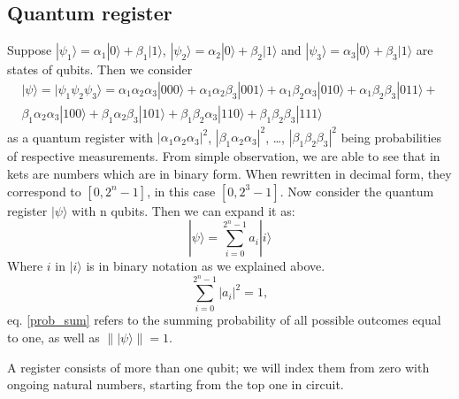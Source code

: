 \subsection{Quantum register}

Suppose $|\psi_1\rangle = \alpha_1 |0\rangle +\beta_1 |1\rangle$, $ |\psi_2\rangle = \alpha_2 |0\rangle +\beta_2 |1\rangle$ and $|\psi_3\rangle = \alpha_3 |0\rangle +\beta_3 |1\rangle $ are states of qubits. Then we consider 
\begin{equation} \label{3qubitsystem}
  \begin{aligned}
    |\psi\rangle = |\psi_1 \psi_2 \psi_3\rangle = 
    \alpha_1 \alpha_2 \alpha_3 |000\rangle +
    \alpha_1 \alpha_2 \beta_3 |001\rangle +
    \alpha_1 \beta_2 \alpha_3 |010\rangle +
    \alpha_1 \beta_2 \beta_3 |011\rangle + \\
    \beta_1 \alpha_2 \alpha_3 |100\rangle +
    \beta_1 \alpha_2 \beta_3 |101\rangle +
    \beta_1 \beta_2 \alpha_3 |110\rangle +
    \beta_1 \beta_2 \beta_3 |111\rangle  
    \end{aligned}
\end{equation}
as a quantum register with $ |\alpha_1 \alpha_2 \alpha_3|^2$, $ |\beta_1 \alpha_2 \alpha_3|^2$, \dots , $|\beta_1 \beta_2 \beta_3 |^2$ being probabilities of respective measurements. From simple observation, we are able to see that in kets are numbers which are in binary form. When rewritten in decimal form, they correspond to $[0,2^{n}-1]$, in this case $[0,2^{3}-1]$. Now consider the quantum register $|\psi\rangle$ with n qubits. Then we can expand it as:
\begin{equation}
    |\psi\rangle =  \sum_{i=0}^{2^n-1} a_i |i\rangle 
\end{equation}
Where $i$ in $|i\rangle $ is in binary notation as we explained above.
\begin{equation} \label{prob_sum}
    \sum_{i=0}^{2^n-1} |a_i|^2 = 1,
\end{equation}
 eq. \ref{prob_sum} refers to the summing probability of all possible outcomes equal to one, as well as $\lVert | \psi \rangle \rVert = 1$. 

 A register consists of more than one qubit; we will index them from zero with ongoing natural numbers, starting from the top one in circuit.

